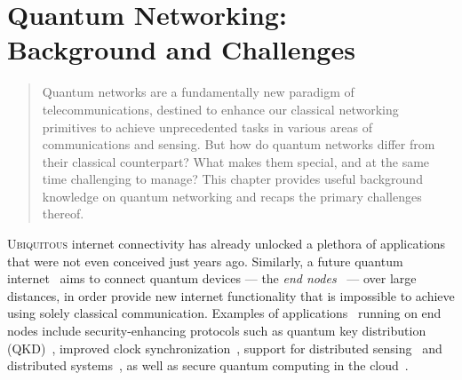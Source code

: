 \chapter
 [Quantum Networking: Background and Challenges]
 {Quantum Networking:\\Background and Challenges}
\label{chp:background}

\begin{abstract}
Quantum networks are a fundamentally new paradigm of telecommunications, destined to enhance our
classical networking primitives to achieve unprecedented tasks in various areas of
communications and sensing. But how do quantum networks differ from their classical counterpart?
What makes them special, and at the same time challenging to manage? This chapter provides useful
background knowledge on quantum networking and recaps the primary challenges thereof.
\end{abstract}



\newpage


\lettrine{U}{biquitous} internet connectivity has already unlocked a plethora of applications that
were not even conceived just years ago. Similarly, a future quantum
internet~\cite{kimble_2008_quantum, wehner_2018_stages} aims to connect quantum devices --- the
\emph{end nodes}~\cite{wehner_2018_stages} --- over large distances, in order provide new internet
functionality that is impossible to achieve using solely classical communication. Examples of
applications~\cite{wehner_2018_stages} running on end nodes include security-enhancing protocols
such as quantum key distribution (QKD)~\cite{ekert_1991_e91, bennett_2014_bb84}, improved clock
synchronization~\cite{komar_2014_clocks}, support for distributed
sensing~\cite{gottesman_2012_telescope} and distributed systems~\cite{benor_2005_byzantine}, as well
as secure quantum computing in the cloud~\cite{broadbent_2009_ubqc, childs_2005_secure_qc}.

